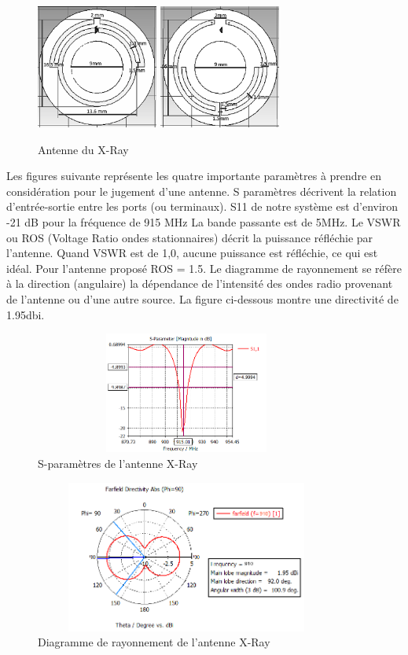\documentclass[11pt, a4paper, twoside]{book}
\begin{document}
\begin{figure}[H]
\centering
\includegraphics[width=4cm]{front11}
\includegraphics[width=4cm]{back22}
\caption{Antenne du X-Ray}
\end{figure}

Les figures suivante représente les quatre importante paramètres à prendre en considération pour le jugement d'une antenne. S paramètres décrivent la relation d'entrée-sortie entre les ports (ou terminaux). S11 de notre système est d'environ -21 dB pour la fréquence de 915 MHz La bande passante est de 5MHz. Le VSWR ou ROS (Voltage Ratio ondes stationnaires) décrit la puissance réfléchie par l'antenne. Quand VSWR est de 1,0, aucune puissance est réfléchie, ce qui est idéal. Pour l'antenne proposé ROS = 1.5. Le diagramme de rayonnement se réfère à la direction (angulaire) la dépendance de l'intensité des ondes radio provenant de l'antenne ou d'une autre source. La figure ci-dessous montre une directivité de 1.95dbi.

\begin{figure}[H]
\centering
\includegraphics[width=10cm,height=4cm]{uses11}
\caption{S-paramètres de l'antenne X-Ray}
\end{figure} 

\begin{figure}[H]
\centering
\includegraphics[width=10cm,height=5cm]{usefar}
\caption{Diagramme de rayonnement de l'antenne X-Ray}
\end{figure} 
\end{document}
